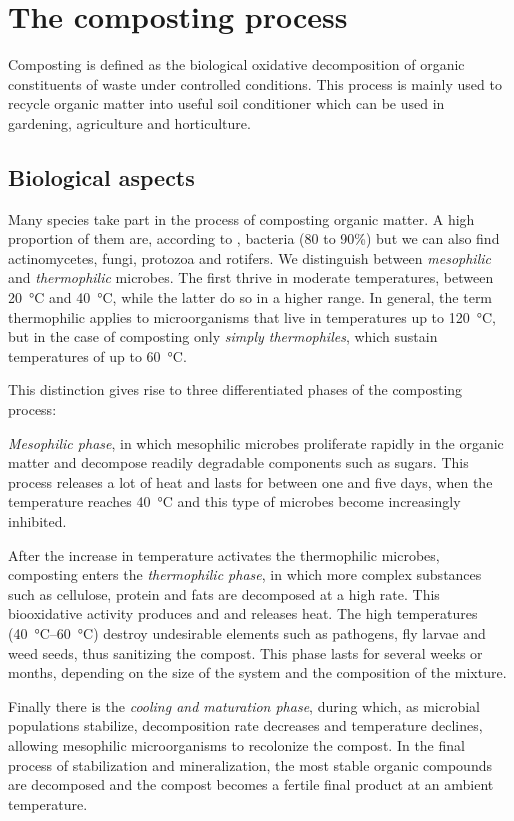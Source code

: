 \documentclass[12pt, a4paper, twocolumn, twoside]{article}
\numberwithin{table}{section}
\numberwithin{figure}{section}
\numberwithin{equation}{section}
\begin{document}
\section{The composting process} 
Composting is defined as the biological oxidative decomposition of organic constituents of waste under controlled conditions. This process is mainly used to recycle organic matter into useful soil conditioner which can be used in gardening, agriculture and horticulture.

\subsection{Biological aspects}
Many species take part in the process of composting organic matter. A high proportion of them are, according to \cite{cornell}, bacteria (80 to 90\%) but we can also find actinomycetes, fungi, protozoa and rotifers. We distinguish between \emph{mesophilic} and \emph{thermophilic} microbes. The first thrive in moderate temperatures, between \SI{20}{\celsius} and \SI{40}{\celsius}, while the latter do so in a higher range. In general, the term thermophilic applies to microorganisms that live in temperatures up to \SI{120}{\celsius}, but in the case of composting only \emph{simply thermophiles}, which sustain temperatures of up to \SI{60}{\celsius}.

This distinction gives rise to three differentiated phases of the composting process:

\emph{Mesophilic phase}, in which mesophilic microbes proliferate rapidly in the organic matter and decompose readily degradable components such as sugars. This process releases a lot of heat and lasts for between one and five days, when the temperature reaches \SI{40}{\celsius} and this type of microbes become increasingly inhibited.

After the increase in temperature activates the thermophilic microbes, composting enters the \emph{thermophilic phase}, in which more complex substances such as cellulose, protein and fats are decomposed at a high rate. This biooxidative activity produces  and  and releases heat. The high temperatures (\SIrange{40}{60}{\celsius}) destroy undesirable elements such as pathogens, fly larvae and weed seeds, thus sanitizing the compost. This phase lasts for several weeks or months, depending on the size of the system and the composition of the mixture.

Finally there is the \emph{cooling and maturation phase}, during which, as microbial populations stabilize, decomposition rate decreases and temperature declines, allowing mesophilic microorganisms to recolonize the compost. In the final process of stabilization and mineralization, the most stable organic compounds are decomposed and the compost becomes a fertile final product at an ambient temperature.
 
\end{document}
